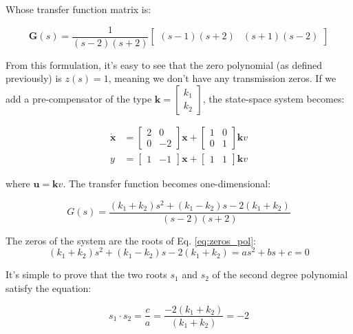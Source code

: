 \documentclass{scrreprt}
\begin{document}
Whose transfer function matrix is:

\begin{equation}
    \boldsymbol{G}(s)=\frac{1}{(s-2)(s+2)} \begin{bmatrix}
        (s-1)(s+2) & (s+1)(s-2)
    \end{bmatrix}
\end{equation}

From this formulation, it's easy to see that the zero polynomial (as defined previously) is $z(s)=1$, meaning we don't have any transmission zeros. If we add a pre-compensator of the type $\boldsymbol{k}=\begin{bmatrix}
    k_1 \\ k_2
\end{bmatrix}$, the state-space system becomes:

\begin{align}
\dot{\boldsymbol{x}} &= \begin{bmatrix} 2 & 0 \\ 0 & -2 \end{bmatrix} \boldsymbol{x} + \begin{bmatrix} 1 & 0 \\ 0 & 1 \end{bmatrix} \boldsymbol{k}v \\
y &= \begin{bmatrix} 1 & -1 \end{bmatrix} \boldsymbol{x} + \begin{bmatrix} 1 & 1 \end{bmatrix} \boldsymbol{k}v
\end{align}

where $\boldsymbol{u}=\boldsymbol{k}v$. The transfer function becomes one-dimensional:

\begin{equation}
    G(s)=\frac{(k_1+k_2)s^2+(k_1-k_2)s-2(k_1+k_2)}{(s-2)(s+2)}
\end{equation}

The zeros of the system are the roots of Eq. \ref{eq:zeros_pol}:
\begin{equation}
    (k_1+k_2)s^2+(k_1-k_2)s-2(k_1+k_2)=as^2+bs+c=0
    \label{eq:zeros_pol}
\end{equation}

It's simple to prove that the two roots $s_1$ and $s_2$ of the second degree polynomial satisfy the equation:

\begin{equation}
    s_1\cdot s_2 = \frac{c}{a}= \frac{-2(k_1+k_2)}{(k_1+k_2)}=-2
\end{equation}
\end{document}
